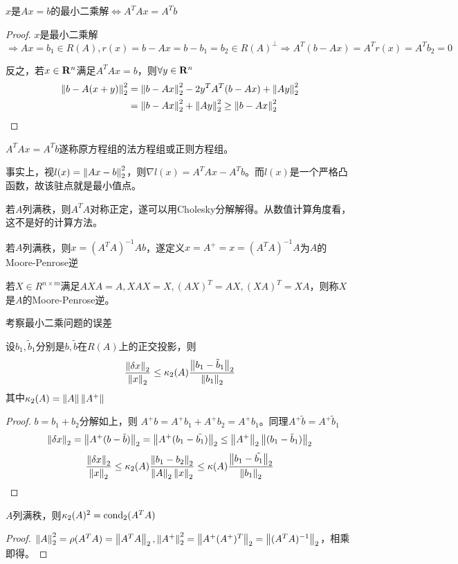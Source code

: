 \documentclass{ctexart}
\begin{document}
\begin{Thm}
$x$是$Ax=b$的最小二乘解$\Leftrightarrow A^TAx=A^Tb$
\end{Thm}
\begin{proof}
$x$是最小二乘解$\Rightarrow Ax=b_1\in R(A),r(x)=b-Ax=b-b_1=b_2\in R(A)^\perp\Rightarrow A^T(b-Ax)=A^Tr(x)=A^Tb_2=0$

反之，若$x\in\mathbf{R}^n$满足$A^TAx=b$，则$\forall y\in \mathbf{R}^n$
\begin{align*}
\left\|b-A(x+y) \right\|_2^2&=\left\|b-Ax \right\|_2^2-2y^TA^T(b-Ax)+\left\|Ay \right\|_2^2\\
&=\left\|b-Ax \right\|_2^2+\left\|Ay \right\|_2^2\geq \left\|b-Ax \right\|_2^2
\end{align*}
\end{proof}

$A^TAx=A^Tb$遂称原方程组的法方程组或正则方程组。

事实上，视$l(x)=\left\|Ax-b \right\|_2^2$，则$\nabla l(x)=A^TAx-A^Tb$。而$l(x)$是一个严格凸函数，故该驻点就是最小值点。

若$A$列满秩，则$A^TA$对称正定，遂可以用Cholesky分解解得。从数值计算角度看，这不是好的计算方法。

若$A$列满秩，则$x=(A^TA)^{-1}Ab$，遂定义$x=A^+=x=(A^TA)^{-1}A$为$A$的Moore-Penrose逆

\begin{Def}[MP逆]
若$X\in R^{n\times m}$满足$AXA=A,XAX=X,(AX)^T=AX,(XA)^T=XA$，则称$X$是$A$的Moore-Penrose逆。
\end{Def}

考察最小二乘问题的误差
\begin{Thm}
设$b_1,\tilde{b}_1$分别是$b,\tilde{b}$在$R(A)$上的正交投影，则
\[\frac{\left\|\delta x \right\|_2}{\left\|x \right\|_2}\leq\kappa_2(A)\frac{\left\|b_1-\tilde{b}_1 \right\|_2}{\left\|b_1 \right\|_2}\]
其中$\kappa_2(A)=\left\|A \right\|\left\|A^+ \right\|$
\end{Thm}

\begin{proof}
$b=b_1+b_2$分解如上，则 $A^+b=A^+b_1+A^+b_2=A^+b_1$。同理$A^+\tilde b=A^+\tilde b_1$
\[\left\|\delta x \right\|_2=\left\|A^+(b-\tilde{b}) \right\|_2=\left\|A^+(b_1-\tilde{b_1}) \right\|_2\leq \left\|A^+ \right\|_2\left\|(b_1-\tilde b_1) \right\|_2\]
\[\frac{\left\|\delta x \right\|_2}{\left\|x \right\|_2}\leq\kappa_2(A)\frac{\left\|b_1-b_2 \right\|_2}{\left\|A \right\|_2\left\|x \right\|_2}\leq\kappa(A)\frac{\left\|b_1-\tilde{b_1} \right\|_2}{\left\|b_1 \right\|_2}\]
\end{proof}

\begin{Thm}
$A$列满秩，则$\kappa_2(A)^2=\mathrm{cond}_2(A^TA)$
\end{Thm}
\begin{proof}
$\left\|A \right\|_2^2=\rho(A^TA)=\left\|A^TA \right\|_2,\left\|A^+ \right\|_2^2=\left\|A^+(A^+)^T \right\|_2=\left\|(A^TA)^{-1} \right\|_2$，相乘即得。
\end{proof}
\end{document}
